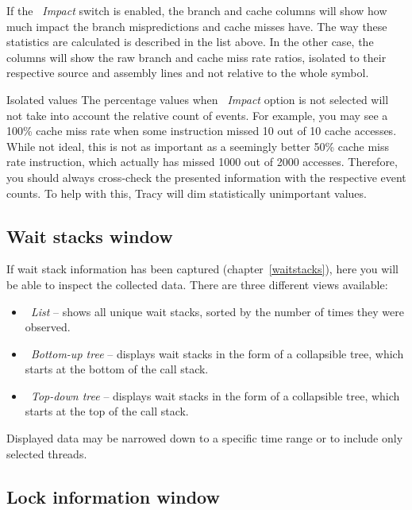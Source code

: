 \documentclass[hidelinks,titlepage,a4paper,twoside]{article}
\begin{document}
If the \emph{\faCarBurst{}~Impact} switch is enabled, the branch and cache columns will show how much impact the branch mispredictions and cache misses have. The way these statistics are calculated is described in the list above. In the other case, the columns will show the raw branch and cache miss rate ratios, isolated to their respective source and assembly lines and not relative to the whole symbol.

\begin{bclogo}[
noborder=true,
couleur=black!5,
logo=\bcattention
]{Isolated values}
The percentage values when \emph{\faCarBurst{}~Impact} option is not selected will not take into account the relative count of events. For example, you may see a 100\% cache miss rate when some instruction missed 10 out of 10 cache accesses. While not ideal, this is not as important as a seemingly better 50\% cache miss rate instruction, which actually has missed 1000 out of 2000 accesses. Therefore, you should always cross-check the presented information with the respective event counts. To help with this, Tracy will dim statistically unimportant values.
\end{bclogo}

\subsection{Wait stacks window}
\label{waitstackswindow}

If wait stack information has been captured (chapter~\ref{waitstacks}), here you will be able to inspect the collected data. There are three different views available:

\begin{itemize}
\item \emph{\faTable{}~List} -- shows all unique wait stacks, sorted by the number of times they were observed.
\item \emph{\faTree{}~Bottom-up tree} -- displays wait stacks in the form of a collapsible tree, which starts at the bottom of the call stack.
\item \emph{\faTree{}~Top-down tree} -- displays wait stacks in the form of a collapsible tree, which starts at the top of the call stack.
\end{itemize}

Displayed data may be narrowed down to a specific time range or to include only selected threads.

\subsection{Lock information window}
\label{lockwindow}
\end{document}
